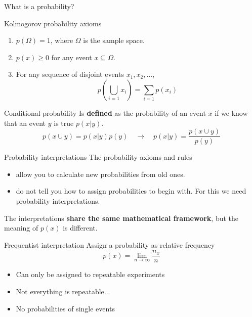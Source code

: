 \documentclass[
aspectratio=169,
14pt,
professionalfonts
]{beamer}
\begin{document}
\begin{frame}
\centering
\Large
What is a probability?
\end{frame}

\begin{frame}{Kolmogorov probability axioms}
\begin{enumerate}
  \item $ p(\Omega) = 1 $, where \( \Omega \) is the sample space.
  \item $ p(x) \geq 0 $ for any event \( x \subseteq \Omega \).
  \item For any sequence of disjoint events \( x_1, x_2, \dots \),
        $$
        p\left( \bigcup_{i=1} x_i \right) = \sum_{i=1} p(x_i)
        $$
\end{enumerate}
\end{frame}


\begin{frame}{Conditional probability}
Is \textbf{defined} as the probability of an event $x$ if we know that an event $y$ is true $p(x|y)$.
$$p(x \cup y) = p(x|y)p(y) \quad \to \quad p(x|y) = \frac{p(x \cup y)}{p(y)}$$
\end{frame}

\begin{frame}{Probability interpretations}
    The probability axioms and rules
    \begin{itemize}
        \item allow you to calculate new probabilities from old ones.
        \item do not tell you how to assign probabilities to begin with. For this we need probability interpretations.
    \end{itemize}

    The interpretations \textbf{share the same mathematical framework}, but the meaning of $p(x)$ is different.
\end{frame}

\begin{frame}{Frequentist interpretation}
Assign a probability as relative frequency
$$
p(x) = \lim_{n\to\infty} \frac{n_x}{n}
$$

\begin{itemize}
    \item Can only be assigned to repeatable experiments
    \item Not everything is repeatable...
    \item No probabilities of single events
\end{itemize}
\end{frame}
\end{document}
